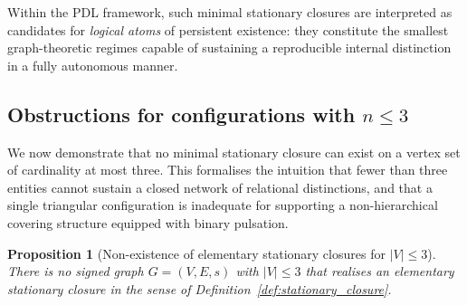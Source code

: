 \documentclass[11pt,a4paper]{article}
\newtheorem{proposition}[theorem]{Proposition}
\theoremstyle{definition}
\begin{document}
Within the PDL framework, such minimal stationary closures are interpreted as candidates for \emph{logical atoms} of persistent existence: they constitute the smallest graph-theoretic regimes capable of sustaining a reproducible internal distinction in a fully autonomous manner.\cite{PDL_Main_2026,PDL_TO_Dialogue_2026}

\subsection{Obstructions for configurations with \texorpdfstring{$n \leq 3$}{n ≤ 3}}

We now demonstrate that no minimal stationary closure can exist on a vertex set of cardinality at most three. This formalises the intuition that fewer than three entities cannot sustain a closed network of relational distinctions, and that a single triangular configuration is inadequate for supporting a non-hierarchical covering structure equipped with binary pulsation.\cite{PDL_Intro_2026,PDL_Main_2026,Harary1953}

\begin{proposition}[Non-existence of elementary stationary closures for $|V|\leq 3$]
\label{prop:no_n_leq_3}
There is no signed graph $G=(V,E,s)$ with $|V|\leq 3$ that realises an elementary stationary closure in the sense of Definition~\ref{def:stationary_closure}.
\end{proposition}
\end{document}
